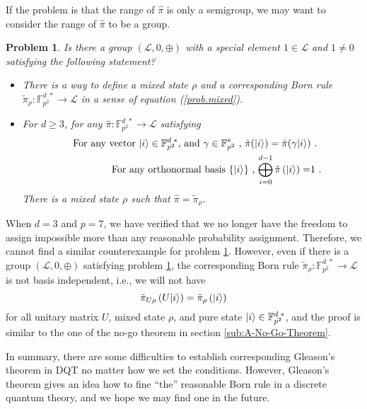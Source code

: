 \documentclass[english,12pt]{iopart}
\theoremstyle{plain}
\newtheorem{problem}[thm]{Problem}
\newcommand{\ff}[1]{\mathbb{F}_{#1}}
\newcommand{\ffzd}[1]{{\mathbb{F}^{d\;*}_{#1}}}
\begin{document}
If the problem is that the range of $\hat{\pi}$ is only a semigroup,
we may want to consider the range of $\hat{\pi}$ to be a group.
\begin{problem}
\label{thm:GleasonDQT-group}Is there a group $\left(\mathscr{L},0,\oplus\right)$
with a special element $1\in\mathscr{L}$ and $1\ne0$ satisfying
the following statement? 
\begin{itemize}
\item There is a way to define a mixed state $\rho$ and a corresponding
Born rule $\tilde{\pi}_{\rho}:\ffzd{p^{2}}\rightarrow\mathscr{L}$
in a sense of equation (\ref{prob.mixed}).
\item For $d\ge3$, for any $\hat{\pi}:\ffzd{p^{2}}\rightarrow\mathscr{L}$
satisfying 
\begin{eqnarray}
 &  & \textrm{For any vector }\ket{i}\in\ffzd{p^{2}}\textrm{, and }\gamma\in\ff{p^{2}}^{*}\textrm{ , }\hat{\pi}(\ket{i})=\hat{\pi}(\gamma\ket{i})\textrm{ . }\label{eq:parallel-DQT-1}\\
 &  & \textrm{For any orthonormal basis }\{\ket{i}\}\textrm{ , }{\displaystyle \bigoplus_{i=0}^{d-1}\hat{\pi}\left(\ket{i}\right)=}1\textrm{ .}\label{eq:total-probability-DQT-1}
\end{eqnarray}
There is a mixed state $\rho$ such that $\hat{\pi}=\tilde{\pi}_{\rho}$.
\end{itemize}
\end{problem}
When $d=3$ and $p=7$, we have verified that we no longer have the
freedom to assign impossible more than any reasonable probability
assignment. Therefore, we cannot find a similar counterexample for
problem \ref{thm:GleasonDQT-group}. However, even if there is a group
$\left(\mathscr{L},0,\oplus\right)$ satisfying problem \ref{thm:GleasonDQT-group},
the corresponding Born rule $\tilde{\pi}_{\rho}:\ffzd{p^{2}}\rightarrow\mathscr{L}$
is not basis independent, i.e., we will not have 
\begin{equation}
\tilde{\pi}_{U\rho}\left(U{\left\vert{i}\right\rangle}\right)=\tilde{\pi}_{\rho}\left({\left\vert{i}\right\rangle}\right)\label{eq:rotation-1}
\end{equation}
for all unitary matrix $U$, mixed state $\rho$, and pure state $\ket{i}\in\ffzd{p^{2}}$,
and the proof is similar to the one of the no-go theorem in section
\ref{sub:A-No-Go-Theorem}. 

In summary, there are some difficulties to establish corresponding
Gleason's theorem in DQT no matter how we set the conditions. However,
Gleason's theorem gives an idea how to fine ``the'' reasonable Born
rule in a discrete quantum theory, and we hope we may find one in
the future. 
\end{document}
